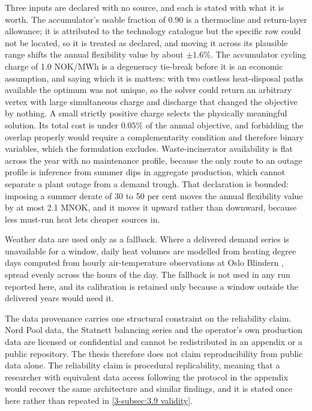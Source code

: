 Three inputs are declared with no source, and each is stated with what it is worth. The accumulator's usable fraction of $0.90$ is a thermocline and return-layer allowance; it is attributed to the technology catalogue but the specific row could not be located, so it is treated as declared, and moving it across its plausible range shifts the annual flexibility value by about $\pm 1.6\%$. The accumulator cycling charge of 1.0 NOK/MWh is a degeneracy tie-break before it is an economic assumption, and saying which it is matters: with two costless heat-disposal paths available the optimum was not unique, so the solver could return an arbitrary vertex with large simultaneous charge and discharge that changed the objective by nothing. A small strictly positive charge selects the physically meaningful solution. Its total cost is under $0.05\%$ of the annual objective, and forbidding the overlap properly would require a complementarity condition and therefore binary variables, which the formulation excludes. Waste-incinerator availability is flat across the year with no maintenance profile, because the only route to an outage profile is inference from summer dips in aggregate production, which cannot separate a plant outage from a demand trough. That declaration is bounded: imposing a summer derate of 30 to 50 per cent moves the annual flexibility value by at most 2.1 MNOK, and it moves it upward rather than downward, because less must-run heat lets cheaper sources in.

Weather data are used only as a fallback. Where a delivered demand series is unavailable for a window, daily heat volumes are modelled from heating degree days computed from hourly air-temperature observations at Oslo Blindern \cite{norsk_klima_service_senter_observasjoner_nodate}, spread evenly across the hours of the day. The fallback is not used in any run reported here, and its calibration is retained only because a window outside the delivered years would need it.

The data provenance carries one structural constraint on the reliability claim. Nord Pool data, the Statnett balancing series and the operator's own production data are licensed or confidential and cannot be redistributed in an appendix or a public repository. The thesis therefore does not claim reproducibility from public data alone. The reliability claim is procedural replicability, meaning that a researcher with equivalent data access following the protocol in the appendix would recover the same architecture and similar findings, and it is stated once here rather than repeated in \autoref{3-subsec:3.9 validity}.

